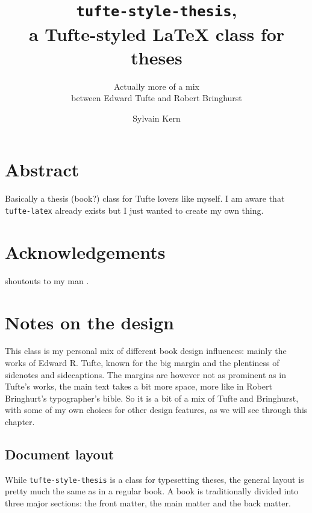 \documentclass[
    11pt,
]{tufte-style-thesis}
\author{Sylvain Kern}
\title{\texttt{tufte-style-thesis},\\a Tufte-styled \LaTeX{} class for theses}
\subtitle{Actually more of a mix\\between Edward Tufte and Robert Bringhurst}
\begin{document}
\maketitle

\frontmatter

\chapter{Abstract}
Basically a thesis (book?) class for Tufte lovers like myself. I am aware that \texttt{tufte-latex} already exists but I just wanted to create my own thing.


\chapter{Acknowledgements}
shoutouts to my man .


\tableofcontents
\listoffigures
\listoftables
\listoflistings



\mainmatter

\chapter{Notes on the design}

This class is my personal mix of different book design influences: mainly the works of Edward R. Tufte, known for the big margin and the plentiness of sidenotes and sidecaptions. The margins are however not as prominent as in Tufte's works, the main text takes a bit more space, more like in Robert Bringhurt's typographer's bible. So it is a bit of a mix of Tufte and Bringhurst, with some of my own choices for other design features, as we will see through this chapter.

\section{Document layout}

While \texttt{tufte-style-thesis} is a class for typesetting theses, the general layout is pretty much the same as in a regular book. A book is traditionally divided into three major sections: the front matter, the main matter and the back matter.
\end{document}
